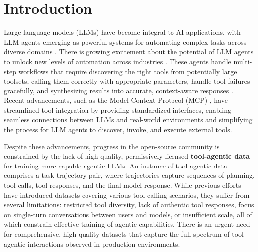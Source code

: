 \section{Introduction}


Large language models (LLMs) have become integral to AI applications, with LLM agents emerging as powerful systems for automating complex tasks across diverse domains \cite{li2024llm}. There is growing excitement about the potential of LLM agents to unlock new levels of automation across industries \citep{ferrag2025llmreasoningautonomousai,bousetouane2025agenticsystemsguidetransforming}. These agents handle multi-step workflows that require discovering the right tools from potentially large toolsets, calling them correctly with appropriate parameters, handle tool failures gracefully, and synthesizing results into accurate, context-aware responses \cite{xu2025llm}. Recent advancements, such as the Model Context Protocol (MCP) \citep{mcp-antrophic-blog}, have streamlined tool integration by providing standardized interfaces, enabling seamless connections between LLMs and real-world environments and simplifying the process for LLM agents to discover, invoke, and execute external tools.


Despite these advancements, progress in the open-source community is constrained by the lack of high-quality, permissively licensed \textbf{tool-agentic data} for training more capable agentic LLMs. 
An instance of tool-agentic data comprises a task-trajectory pair, where trajectories capture sequences of planning, tool calls, tool responses, and the final model response.
While previous efforts \citep{qin2023toolllmfacilitatinglargelanguage, liu2024apigenautomatedpipelinegenerating,liu2025toolacewinningpointsllm,prabhakar2025apigenmtagenticpipelinemultiturn} have introduced datasets covering various tool-calling scenarios, they suffer from several limitations: restricted tool diversity, lack of authentic tool responses, focus on single-turn conversations between users and models, or insufficient scale, all of which constrain effective training of agentic capabilities.
There is an urgent need for comprehensive, high-quality datasets that capture the full spectrum of tool-agentic interactions observed in production environments.

